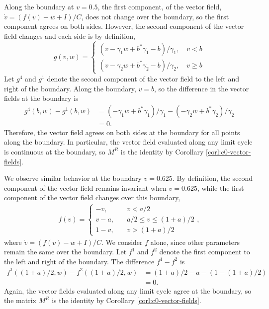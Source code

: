 \documentclass[12pt]{article}
\begin{document}
Along the boundary at $v = 0.5$, the first component, of the vector field, $\dot{v} = (f(v)-w+I)/C$, does not change over the boundary, so the first component agrees on both sides.  However, the second component of the vector field changes and each side is by definition,
 \begin{displaymath}
   g(v,w) = \left\{
     \begin{array}{lr}
       (v-\gamma_1w+b^*\gamma_1-b)/\gamma_1, \quad v < b\\
       (v-\gamma_2w+b^* \gamma_2-b)/\gamma_2, \quad v \geq b
     \end{array}
   \right.
\end{displaymath}
Let $g^4$ and $g^1$ denote the second component of the vector field to the left and right of the boundary.  Along the boundary, $v = b$, so the difference in the vector fields at the boundary is
\begin{equation}
\begin{split}
g^4(b,w) - g^1(b,w) &= (-\gamma_1w+b^*\gamma_1)/\gamma_1- (-\gamma_2w+b^* \gamma_2)/\gamma_2 \\
&= 0.
\end{split}
\end{equation}
Therefore, the vector field agrees on both sides at the boundary for all points along the boundary.  In particular, the vector field evaluated along any limit cycle is continuous at the boundary, so $M^R$ is the identity by Corollary \ref{corl:c0-vector-fields}.

We observe similar behavior at the boundary $v = 0.625$.  By definition, the second component of the vector field remains invariant when $v = 0.625$, while the first component of the vector field changes over this boundary,
\begin{equation}
 \begin{split}
  f(v) = \left \{ \begin{array}{ll} -v,& \quad v< a/2  \\
  v - a, & \quad a/2 \leq v \leq (1+a)/2 \\
  1- v, & \quad v >(1+a)/2 \end{array} \right .,
 \end{split}
\end{equation}
where $\dot{v} = (f(v) - w + I)/C$. We consider $f$ alone, since other parameters remain the same over the boundary.  Let $f^1$ and $f^2$ denote the first component to the left and right of the boundary.  The difference $f^1-f^2$ is
\begin{equation}
\begin{split}
 f^1\left((1+a)/2,w\right) - f^2\left ((1+a)/2,w\right ) &= (1+a)/2 - a - \left (1-(1+a)/2\right )\\
 &= 0.
\end{split}
\end{equation}
Again, the vector fields evaluated along any limit cycle agree at the boundary, so the matrix $M^R$ is the identity by Corollary \ref{corl:c0-vector-fields}.
\end{document}
